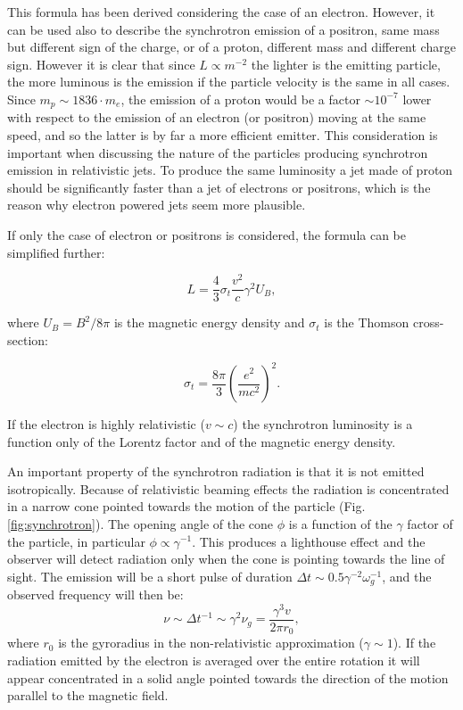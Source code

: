 \documentclass[../main.tex]{subfiles}
\begin{document}
This formula has been derived considering the case of an electron. 
However, it can be used also to describe the synchrotron emission of a positron, same mass but different sign of the charge, or of a proton, different mass and different charge sign.
However it is clear that since $L\propto m^{-2}$ the lighter is the emitting particle, the more luminous is the emission if the particle velocity is the same in all cases.
Since $m_p \sim 1836\cdot m_e$, the emission of a proton would be a factor $\sim 10^{-7}$ lower with respect to the emission of an electron (or positron) moving at the same speed, and so the latter is by far a more efficient emitter.
This consideration is important when discussing the nature of the particles producing synchrotron emission in relativistic jets.
To produce the same luminosity a jet made of proton should be significantly faster than a jet of electrons or positrons, which is the reason why electron powered jets seem more plausible.

If only the case of electron or positrons is considered, the formula can be simplified further:

\begin{equation}
    \label{eq:sync_semp}
    L=\frac{4}{3}\sigma_t\frac{v^2}{c}\gamma^2U_B,
\end{equation}

where $U_B = B^2/8\pi$ is the magnetic energy density and $\sigma_t$ is the Thomson cross-section:

\begin{equation}
    \label{eq:thomson}
    \sigma_t = \frac{8\pi}{3}\left(\frac{e^2}{mc^2}\right)^2.
\end{equation}

If the electron is highly relativistic ($v\sim c$) the synchrotron luminosity is a function only of the Lorentz factor and of the magnetic energy density.

An important property of the synchrotron radiation is that it is not emitted isotropically.
Because of relativistic beaming effects the radiation is concentrated in a narrow cone pointed towards the motion of the particle (Fig.\,\ref{fig:synchrotron}).
The opening angle of the cone $\phi$ is a function of the $\gamma$ factor of the particle, in particular $\phi \propto \gamma^{-1}$.
This produces a lighthouse effect and the observer will detect radiation only when the cone is pointing towards the line of sight.
The emission will be a short pulse of duration $\Delta t \sim 0.5\gamma^{-2} \omega_g^{-1}$, and the observed frequency will then be:
\begin{equation}
    \label{eq:new_freq}
    \nu \sim \Delta t^{-1} \sim \gamma^2\nu_g = \frac{\gamma^3v}{2\pi r_0},
\end{equation}
where $r_0$ is the gyroradius in the non-relativistic approximation ($\gamma \sim 1$).
If the radiation emitted by the electron is averaged over the entire rotation it will appear concentrated in a solid angle pointed towards the direction of the motion parallel to the magnetic field.
\end{document}
